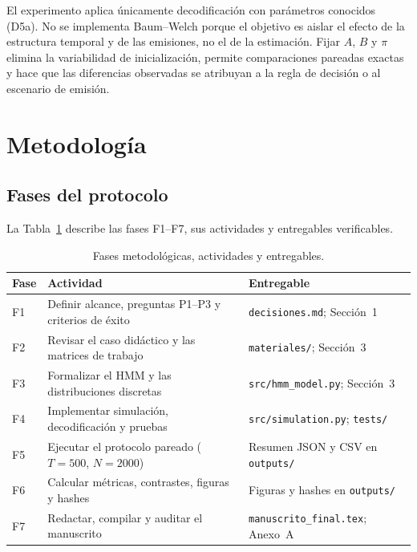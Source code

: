\documentclass[11pt,letterpaper]{article}
\begin{document}
El experimento aplica únicamente decodificación con parámetros conocidos (D5a). No se implementa Baum--Welch porque el objetivo es aislar el efecto de la estructura temporal y de las emisiones, no el de la estimación. Fijar \(A\), \(B\) y \(\pi\) elimina la variabilidad de inicialización, permite comparaciones pareadas exactas y hace que las diferencias observadas se atribuyan a la regla de decisión o al escenario de emisión.

\section{Metodología}

\subsection{Fases del protocolo}

La Tabla~\ref{tab:fases} describe las fases F1--F7, sus actividades y entregables verificables.

\begin{table}[H]
\centering
\caption{Fases metodológicas, actividades y entregables.}
\label{tab:fases}
\small
\begin{tabularx}{\textwidth}{@{}p{0.8cm}>{\raggedright\arraybackslash}X>{\raggedright\arraybackslash}p{5.8cm}@{}}
\toprule
Fase & Actividad & Entregable\\
\midrule
F1 & Definir alcance, preguntas P1--P3 y criterios de éxito & \texttt{decisiones.md}; Sección~1\\
F2 & Revisar el caso didáctico y las matrices de trabajo & \texttt{materiales/}; Sección~3\\
F3 & Formalizar el HMM y las distribuciones discretas & \texttt{src/hmm\_model.py}; Sección~3\\
F4 & Implementar simulación, decodificación y pruebas & \texttt{src/simulation.py}; \texttt{tests/}\\
F5 & Ejecutar el protocolo pareado (\(T=500\), \(N=2000\)) & Resumen JSON y CSV en \texttt{outputs/}\\
F6 & Calcular métricas, contrastes, figuras y hashes & Figuras y hashes en \texttt{outputs/}\\
F7 & Redactar, compilar y auditar el manuscrito & \texttt{manuscrito\_final.tex}; Anexo~A\\
\bottomrule
\end{tabularx}
\end{table}
\end{document}
